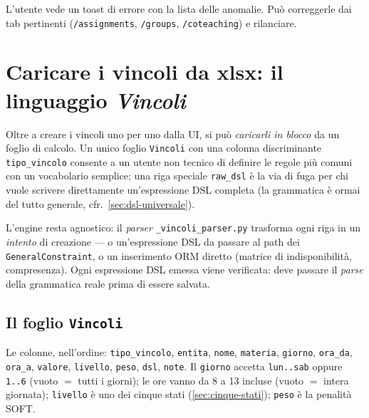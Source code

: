 L'utente vede un toast di errore con la lista delle
anomalie. Pu\`o correggerle dai tab pertinenti
(\texttt{/assignments}, \texttt{/groups},
\texttt{/coteaching}) e rilanciare.

\section{Caricare i vincoli da xlsx: il linguaggio \emph{Vincoli}}
\label{sec:vincoli-xlsx}

\begin{novitabox}
Oltre a creare i vincoli uno per uno dalla UI, si pu\`o \emph{caricarli in
blocco} da un foglio di calcolo. Un unico foglio \texttt{Vincoli} con una
colonna discriminante \texttt{tipo\_vincolo} consente a un utente non
tecnico di definire le regole pi\`u comuni con un vocabolario semplice; una
riga speciale \texttt{raw\_dsl} \`e la via di fuga per chi vuole scrivere
direttamente un'espressione DSL completa (la grammatica \`e ormai del tutto
generale, cfr.\ \cref{sec:dsl-universale}).
\end{novitabox}

L'engine resta agnostico: il \emph{parser} \texttt{\_vincoli\_parser.py}
trasforma ogni riga in un \emph{intento} di creazione --- o un'espressione
DSL da passare al path dei \texttt{GeneralConstraint}, o un inserimento ORM
diretto (matrice di indisponibilit\`a, compresenza). Ogni espressione DSL
emessa viene verificata: deve passare il \emph{parse} della grammatica reale
prima di essere salvata.

\subsection{Il foglio \texttt{Vincoli}}

Le colonne, nell'ordine: \texttt{tipo\_vincolo}, \texttt{entita},
\texttt{nome}, \texttt{materia}, \texttt{giorno}, \texttt{ora\_da},
\texttt{ora\_a}, \texttt{valore}, \texttt{livello}, \texttt{peso},
\texttt{dsl}, \texttt{note}. Il \texttt{giorno} accetta \texttt{lun..sab}
oppure \texttt{1..6} (vuoto $=$ tutti i giorni); le ore vanno da 8 a 13
incluse (vuoto $=$ intera giornata); \texttt{livello} \`e uno dei cinque
stati (\cref{sec:cinque-stati}); \texttt{peso} \`e la penalit\`a SOFT.

